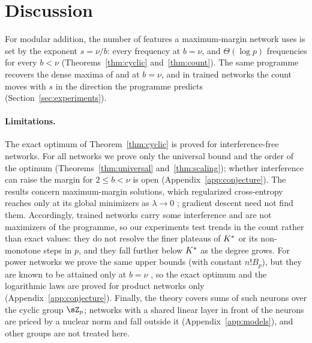 \section{Discussion}\label{sec:discussion}

For modular addition, the number of features a maximum-margin network uses is set by the exponent $s=\nu/b$: every frequency at $b=\nu$, and $\Theta(\log p)$ frequencies for every $b<\nu$ (Theorems~\ref{thm:cyclic} and~\ref{thm:count}). The same programme recovers the dense maxima of \citet{morwani2024feature} and \citet{li2025nsum} at $b=\nu$, and in trained networks the count moves with $s$ in the direction the programme predicts (Section~\ref{sec:experiments}).

\paragraph{Limitations.} The exact optimum of Theorem~\ref{thm:cyclic} is proved for interference-free networks. For all networks we prove only the universal bound and the order of the optimum (Theorems~\ref{thm:universal} and~\ref{thm:scaling}); whether interference can raise the margin for $2\le b<\nu$ is open (Appendix~\ref{app:conjecture}). The results concern maximum-margin solutions, which regularized cross-entropy reaches only at its global minimizers as $\lambda\to0$ \citep{wei2019regularization}; gradient descent need not find them. Accordingly, trained networks carry some interference and are not maximizers of the programme, so our experiments test trends in the count rather than exact values: they do not resolve the finer plateaus of $K^{*}$ or its non-monotone steps in $p$, and they fall further below $K^{*}$ as the degree grows. For power networks we prove the same upper bounds (with constant $n!B_p$), but they are known to be attained only at $b=\nu$ \citep{li2025nsum}, so the exact optimum and the logarithmic laws are proved for product networks only (Appendix~\ref{app:conjecture}). Finally, the theory covers sums of such neurons over the cyclic group $\sZ_p$; networks with a shared linear layer in front of the neurons are priced by a nuclear norm and fall outside it (Appendix~\ref{app:models}), and other groups are not treated here.
